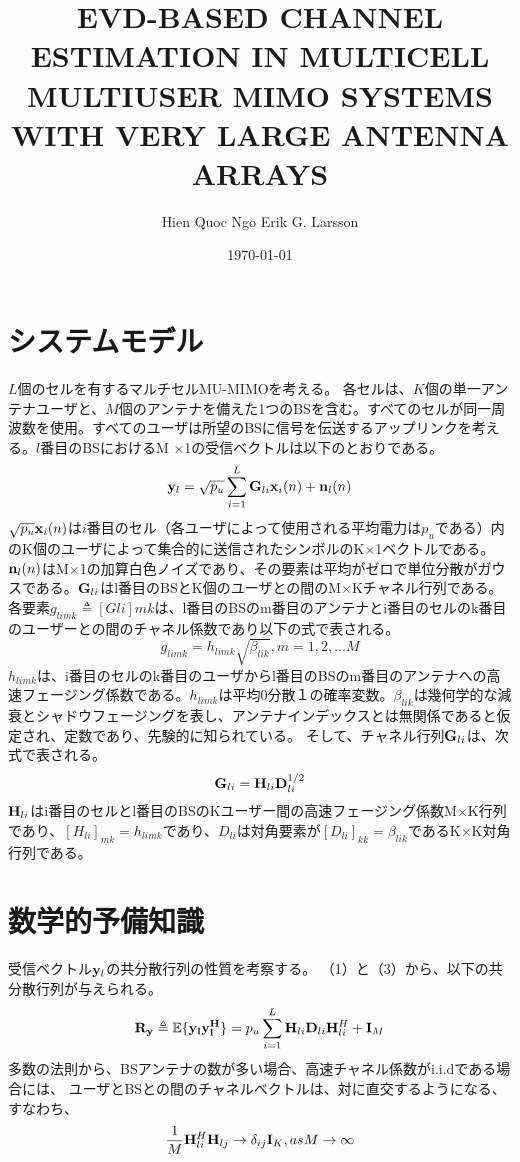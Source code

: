 \documentclass[11pt]{jsarticle}
\title{EVD-BASED CHANNEL ESTIMATION IN MULTICELL MULTIUSER MIMO SYSTEMS
WITH VERY LARGE ANTENNA ARRAYS}
\author{Hien Quoc Ngo Erik G. Larsson}
\date{\today}
\begin{document}
\maketitle
\section{システムモデル}
$L$個のセルを有するマルチセルMU-MIMOを考える。 各セルは、$K$個の単一アンテナユーザと、$M$個のアンテナを備えた1つのBSを含む。すべてのセルが同一周波数を使用。すべてのユーザは所望のBSに信号を伝送するアップリンクを考える。$l$番目のBSにおけるM $\times$1の受信ベクトルは以下のとおりである。
\begin{equation}
  {\bf y}_{l}=\sqrt{p_{u}}\sum_{i=1}^{L}{\bf G}_{li}{\bf x}_{i}(n)+{\bf n}_{l}(n)
\end{equation}
$\sqrt{p_{u}}{\bf x}_{i}(n)$は$i$番目のセル（各ユーザによって使用される平均電力は$p_{u}$である）内のK個のユーザによって集合的に送信されたシンボルのK×1ベクトルである。${\bf n}_{l}(n)$はM×1の加算白色ノイズであり、その要素は平均がゼロで単位分散がガウスである。${\bf G}_{li}$はl番目のBSとK個のユーザとの間のM×Kチャネル行列である。
各要素$g_{limk}\triangleq[Gli]mk$は、l番目のBSのm番目のアンテナとi番目のセルのk番目のユーザーとの間のチャネル係数であり以下の式で表される。
\begin{equation}
  g_{limk}=h_{limk}\sqrt{\beta_{lik}},m=1,2,...M
\end{equation}
$h_{limk}$は、i番目のセルのk番目のユーザからl番目のBSのm番目のアンテナへの高速フェージング係数である。$h_{limk}$は平均0分散１の確率変数。$\beta_{lik}
$は幾何学的な減衰とシャドウフェージングを表し、アンテナインデックスとは無関係であると仮定され、定数であり、先験的に知られている。
そして、チャネル行列${\bf G}_{li}$は、次式で表される。
\begin{equation}
  {\bf G}_{li}={\bf H}_{li}{\bf D}_{li}^{1/2}
\end{equation}
${\bf H}_{li}$はi番目のセルとl番目のBSのKユーザー間の高速フェージング係数M×K行列であり、$[H_{li}]_{mk} = h_{limk}$であり、$D_{li}$は対角要素が$[D_{li}]_{kk} = \beta_{lik}$であるK×K対角行列である。
\section{数学的予備知識}
受信ベクトル${\bf y}_{l}$の共分散行列の性質を考察する。 （1）と（3）から、以下の共分散行列が与えられる。
\begin{equation}
  {\bf R_{y}}\triangleq\mathbb{E}\{{\bf y_{l}y_{l}^{H}}\}=p_{u}\sum_{i=1}^{L}{\bf H}_{li}{\bf D}_{li}{\bf H}_{li}^{H}+{\bf I}_{M}
\end{equation}
多数の法則から、BSアンテナの数が多い場合、高速チャネル係数がi.i.dである場合には、 ユーザとBSとの間のチャネルベクトルは、対に直交するようになる、すなわち、
\begin{equation}
  \frac{1}{M}{\bf H}_{li}^{H}{\bf H}_{lj}\to\delta_{ij}{\bf I}_{K},as M\to\infty
\end{equation}


\end{document}
